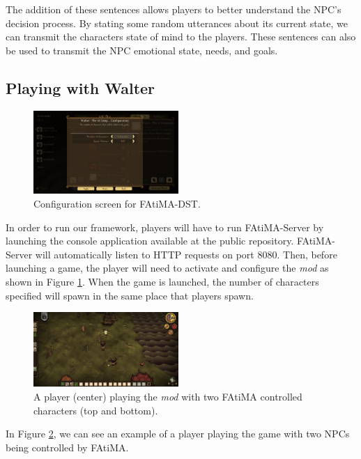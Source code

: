 The addition of these sentences allows players to better understand the NPC's decision process.
By stating some random utterances about its current state, we can transmit the characters state of mind to the players.
These sentences can also be used to transmit the NPC emotional state, needs, and goals.

\subsection{Playing with Walter}

\begin{figure}
  \centering
  \includegraphics[width=0.49\textwidth]{./Images/mod-config}
  \caption{Configuration screen for FAtiMA-DST.}
  \label{fig:mod-config}
\end{figure}

In order to run our framework, players will have to run FAtiMA-Server by launching the console application available at the public repository.
FAtiMA-Server will automatically listen to HTTP requests on port 8080.
Then, before launching a game, the player will need to activate and configure the \textit{mod} as shown in Figure \ref{fig:mod-config}.
When the game is launched, the number of characters specified will spawn in the same place that players spawn.

\begin{figure}
  \centering
  \includegraphics[width=0.49\textwidth]{./Images/multiple-agents}
  \caption{A player (center) playing the \textit{mod} with two FAtiMA controlled characters (top and bottom).}
  \label{fig:multiple-agents}
\end{figure}

In Figure \ref{fig:multiple-agents}, we can see an example of a player playing the game with two NPCs being controlled by FAtiMA.

